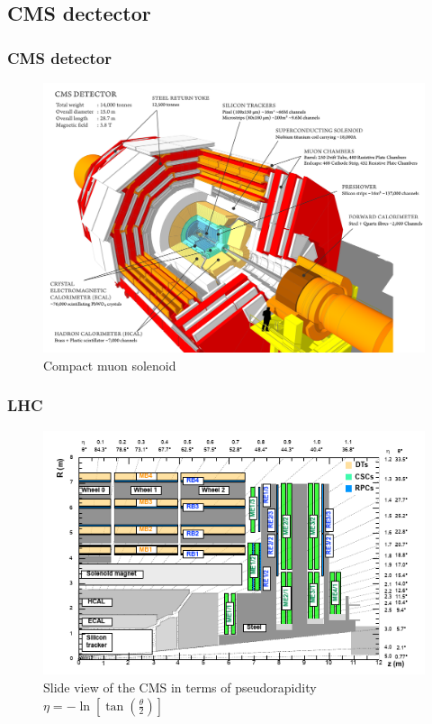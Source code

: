 \documentclass[11pt]{beamer}
\begin{document}
\begin{frame}
\subsection{CMS dectector}
\frametitle{CMS detector}
\begin{center}
	\begin{figure}
		\includegraphics[scale=0.08]{figures/cms.png}
		\caption*{Compact muon solenoid}
	\end{figure}
\end{center}
\end{frame}


\begin{frame}
\frametitle{LHC}
\begin{figure}[ht!]
	\centering
	\includegraphics[scale=0.6]{figures/csc.png}
	\caption*{Slide view of the CMS in terms of pseudorapidity $\eta=-\ln\left[\tan\left(\frac{\theta}{2}\right)\right]$}
\end{figure}
\end{frame}
\end{document}
